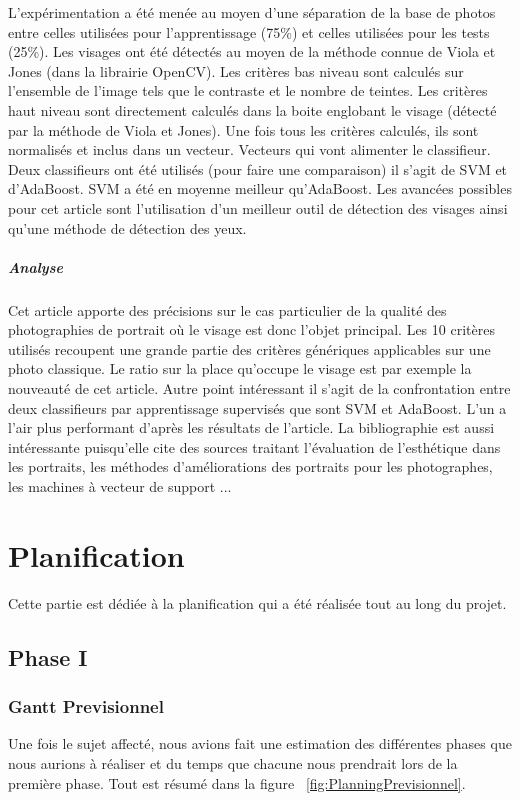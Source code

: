 \documentclass[11pt, french]{report-rd-info}
\begin{document}
L'expérimentation a été menée au moyen d’une séparation de la base de photos entre celles utilisées pour l’apprentissage (75\%) et celles utilisées pour les tests (25\%). Les visages ont été détectés au moyen de la méthode connue de Viola et Jones (dans la librairie OpenCV).
Les critères bas niveau sont calculés sur l’ensemble de l’image tels que le contraste et le nombre de teintes. Les critères haut niveau sont directement calculés dans la boite englobant le visage (détecté par la méthode de Viola et Jones). Une fois tous les critères calculés, ils sont normalisés et inclus dans un vecteur. Vecteurs qui vont alimenter le classifieur. Deux classifieurs ont été utilisés (pour faire une comparaison) il s’agit de SVM et d’AdaBoost. SVM a été en moyenne meilleur qu’AdaBoost.
Les avancées possibles pour cet article sont l’utilisation d’un meilleur outil de détection des visages ainsi qu’une méthode de détection des yeux.
\paragraph{Analyse}
Cet article apporte des précisions sur le cas particulier de la qualité des photographies de portrait où le visage est donc l’objet principal. Les 10 critères utilisés recoupent une grande partie des critères génériques applicables sur une photo classique. Le ratio sur la place qu’occupe le visage est par exemple la nouveauté de cet article.
Autre point intéressant il s’agit de la confrontation entre deux classifieurs par apprentissage supervisés que sont SVM et AdaBoost. L’un a l’air plus performant d’après les résultats de l’article. La bibliographie est aussi intéressante puisqu’elle cite des sources traitant l’évaluation de l’esthétique dans les portraits, les méthodes d’améliorations des portraits pour les photographes, les machines à vecteur de support ...


\chapter{Planification}
Cette partie est dédiée à la planification qui a été réalisée tout au long du projet.

\section{Phase I}
\subsection{Gantt Previsionnel}
Une fois le sujet affecté, nous avions fait une estimation des différentes phases que nous aurions à réaliser et du temps que chacune nous prendrait lors de la première phase. Tout est résumé dans la figure ~\ref{fig:PlanningPrevisionnel}.
\end{document}
